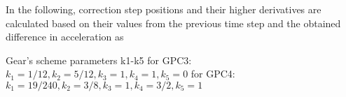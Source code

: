 \par
In the following, correction step positions and their higher derivatives are calculated based on
their values from the previous time step and the obtained difference in acceleration as
\par
Gear’s scheme parameters k1-k5
for GPC3:
$k_1 = 1/12, k_2 = 5/12, k_3 = 1, k_4 = 1, k_5 = 0$
for GPC4:
$k_1 = 19/240, k_2 = 3/8, k_3 = 1, k_4 = 3/2, k_5 = 1$
\par
\newpage
